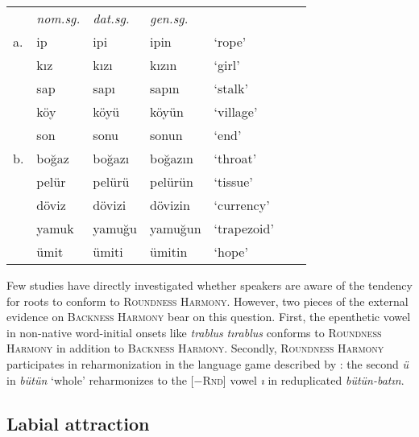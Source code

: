 \begin{example}
\begin{tabular}{lllllll}
   & \emph{nom.sg.} & \emph{dat.sg.} & \emph{gen.sg.}  \\
a. & {ip}           & {ipi}          & {ipin}         & `rope' & \citep[][216]{Clements1982} \\
   & {kız}          & {kızı}         & {kızın}        & `girl'    \\
   & {sap}          & {sapı}         & {sapın}        & `stalk'   \\
   & {köy}          & {köyü}         & {köyün}        & `village' \\
   & {son}          & {sonu}         & {sonun}        & `end'     \\
b. & {boğaz}        & {boğazı}       & {boğazın}      & `throat'  & \citep{TELL} \\
   & {pelür}        & {pelürü}       & {pelürün}      & `tissue' \\
   & {döviz}        & {dövizi}       & {dövizin}      & `currency' \\
   & {yamuk}        & {yamuğu}       & {yamuğun}      & `trapezoid' \\
   & {ümit}         & {ümiti}        & {ümitin}       & `hope'     \\
\end{tabular}
\end{example}

Few studies have directly investigated whether speakers are aware of the tendency for roots to conform to \textsc{Roundness Harmony}. However, two pieces of the external evidence on \textsc{Backness Harmony} bear on this question. First, the epenthetic vowel in non-native word-initial onsets like \emph{trablus} \alt{} \emph{tırablus} conforms to \textsc{Roundness Harmony} in addition to \textsc{Backness Harmony}. Secondly, \textsc{Roundness Harmony} participates in reharmonization in the language game described by \citeauthor{Harrison2001}: the second \emph{ü} in \emph{bütün} `whole' reharmonizes to the [$-$\textsc{Rnd}] vowel \emph{ı} in reduplicated \emph{bütün-batın}.

\subsection{Labial attraction}

